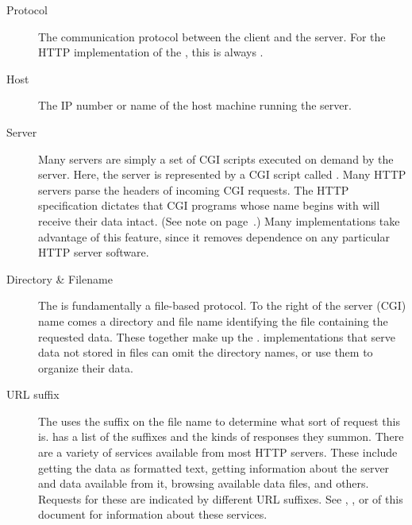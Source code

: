 \documentclass[justify]{dods-paper}
\begin{document}
\begin{description}
  
\item[Protocol] The communication protocol between the client and the
  server.  For the HTTP implementation of the \DAP, this is always
  .

\item[Host] The IP number or name of the host machine running the \DAP
  server.
  
\item[Server] Many \DAP servers are simply a set of CGI scripts
  executed on demand by the  server.  Here, the server is
  represented by a CGI script called .  Many HTTP servers
  parse the headers of incoming CGI requests.  The HTTP specification
  dictates that CGI programs whose name begins with  will
  receive their data intact.  (See note on page~\pageref{note-1}.)
  Many \DAP implementations take advantage of this feature, since it
  removes dependence on any particular HTTP server software.
  
\item[Directory \& Filename] The \DAP is fundamentally a file-based
  protocol.  To the right of the server (CGI) name comes a directory
  and file name identifying the file containing the requested data.
  These together make up the .  \DAP implementations
  that serve data not stored in files can omit the directory names, or
  use them to organize their data.

\item[URL suffix] The \DAP uses the suffix on the file name to
  determine what sort of request this is.  
  has a list of the suffixes and the kinds of responses they 
  summon.  There are a variety of services available from most \DAP
  HTTP servers.  These include getting the data as formatted text,
  getting information about the server and data available from it, 
  browsing available data files, and others.   Requests for these are
  indicated by different URL suffixes.  See \DAPASCII, \DAPHTML, or
   of this document for information about these
  services. 


\end{description}
\end{document}
